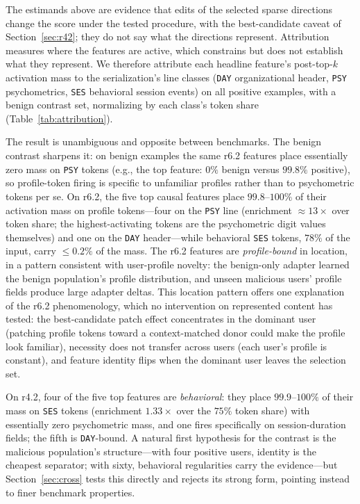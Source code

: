 \documentclass[10pt]{article} %
\newcommand{\rsix}{r6.2}
\newcommand{\rfour}{r4.2}
\begin{document}
The estimands above are evidence that edits of the selected sparse directions
change the score under the tested procedure, with the best-candidate caveat
of Section~\ref{sec:r42}; they do not say what the directions represent.
Attribution measures where the features are active, which constrains but
does not establish what they represent. We therefore attribute each headline
feature's post-top-$k$ activation mass to the serialization's line classes
(\texttt{DAY} organizational header, \texttt{PSY} psychometrics,
\texttt{SES} behavioral session events) on all positive examples, with a
benign contrast set, normalizing by each class's token share
(Table~\ref{tab:attribution}).

The result is unambiguous and opposite between benchmarks. The benign
contrast sharpens it: on benign examples the same \rsix{} features place
essentially zero mass on \texttt{PSY} tokens (e.g., the top feature:
$0\%$ benign versus $99.8\%$ positive), so profile-token firing is specific
to unfamiliar profiles rather than to psychometric tokens per se. On
\rsix{}, the five top causal features place $99.8$--$100\%$ of their
activation mass on profile tokens---four on the \texttt{PSY} line (enrichment $\approx$$13\times$
over token share; the highest-activating tokens are the psychometric digit
values themselves) and one on the \texttt{DAY} header---while behavioral
\texttt{SES} tokens, $78\%$ of the input, carry $\leq 0.2\%$ of the mass.
The \rsix{} features are \emph{profile-bound} in location, in a pattern
consistent with user-profile novelty: the benign-only adapter learned the
benign population's profile distribution, and unseen malicious users' profile
fields produce large adapter deltas. This location pattern offers one
explanation of the \rsix{} phenomenology, which no intervention on
represented content has tested: the best-candidate patch effect concentrates
in the dominant user (patching profile tokens toward a context-matched donor
could make the profile look familiar), necessity does not transfer across
users (each user's profile is constant), and feature identity flips when the
dominant user leaves the selection set.

On \rfour{}, four of the five top features are \emph{behavioral}: they place
$99.9$--$100\%$ of their mass on \texttt{SES} tokens (enrichment $1.33\times$
over the $75\%$ token share) with essentially zero psychometric mass, and one
fires specifically on session-duration fields; the fifth is
\texttt{DAY}-bound. A natural first hypothesis for the contrast is the malicious population's
structure---with four positive users, identity is the cheapest separator;
with sixty, behavioral regularities carry the evidence---but
Section~\ref{sec:cross} tests this directly and rejects its strong form,
pointing instead to finer benchmark properties.
\end{document}

